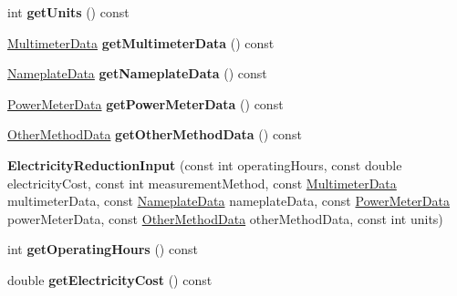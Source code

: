 \begin{DoxyCompactItemize}
int {\bfseries get\+Units} () const
\item 
\mbox{\label{class_electricity_reduction_input_a2a68f5f0b38e54aee9dfcf3ab490d07d}} 
\hyperlink{class_multimeter_data}{Multimeter\+Data} {\bfseries get\+Multimeter\+Data} () const
\item 
\mbox{\label{class_electricity_reduction_input_a2d63fc41d86ea60fe16389bab1b4ac09}} 
\hyperlink{class_nameplate_data}{Nameplate\+Data} {\bfseries get\+Nameplate\+Data} () const
\item 
\mbox{\label{class_electricity_reduction_input_a4ba54572c92951231af9c506d3f494e7}} 
\hyperlink{class_power_meter_data}{Power\+Meter\+Data} {\bfseries get\+Power\+Meter\+Data} () const
\item 
\mbox{\label{class_electricity_reduction_input_a9963ea6b61ac8bb57026e3e2c7d307ca}} 
\hyperlink{class_other_method_data}{Other\+Method\+Data} {\bfseries get\+Other\+Method\+Data} () const
\item 
\mbox{\label{class_electricity_reduction_input_a4bfb56de8fd6b191370d96c4470960a2}} 
{\bfseries Electricity\+Reduction\+Input} (const int operating\+Hours, const double electricity\+Cost, const int measurement\+Method, const \hyperlink{class_multimeter_data}{Multimeter\+Data} multimeter\+Data, const \hyperlink{class_nameplate_data}{Nameplate\+Data} nameplate\+Data, const \hyperlink{class_power_meter_data}{Power\+Meter\+Data} power\+Meter\+Data, const \hyperlink{class_other_method_data}{Other\+Method\+Data} other\+Method\+Data, const int units)
\item 
\mbox{\label{class_electricity_reduction_input_a585b741c3a3e90278ebc42d123d6edf8}} 
int {\bfseries get\+Operating\+Hours} () const
\item 
\mbox{\label{class_electricity_reduction_input_a0f6334d0398e74c943dc27a7f933d8a1}} 
double {\bfseries get\+Electricity\+Cost} () const
\item 
\mbox{\label{class_electricity_reduction_input_a8a69fb38d3c5e84423298694247d4792}} 

\end{DoxyCompactItemize}
